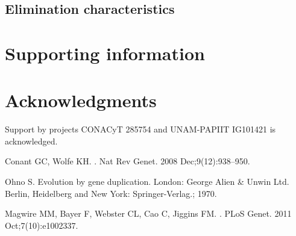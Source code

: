 \documentclass[10pt,letterpaper]{article} %
\begin{document}
\subsection*{Elimination characteristics}



\section*{Supporting information} %
\section*{Acknowledgments} %

\nolinenumbers

Support by projects CONACyT 285754 and UNAM-PAPIIT IG101421 is acknowledged. 
\begin{thebibliography}{10} %
%
%
% 

Conant GC, Wolfe KH.
.
\newblock Nat Rev Genet. 2008 Dec;9(12):938--950.

Ohno S.
\newblock Evolution by gene duplication.
\newblock London: George Alien \& Unwin Ltd. Berlin, Heidelberg and New York:
  Springer-Verlag.; 1970.

Magwire MM, Bayer F, Webster CL, Cao C, Jiggins FM.
.
\newblock PLoS Genet. 2011 Oct;7(10):e1002337.

\end{thebibliography} %
\end{document}
